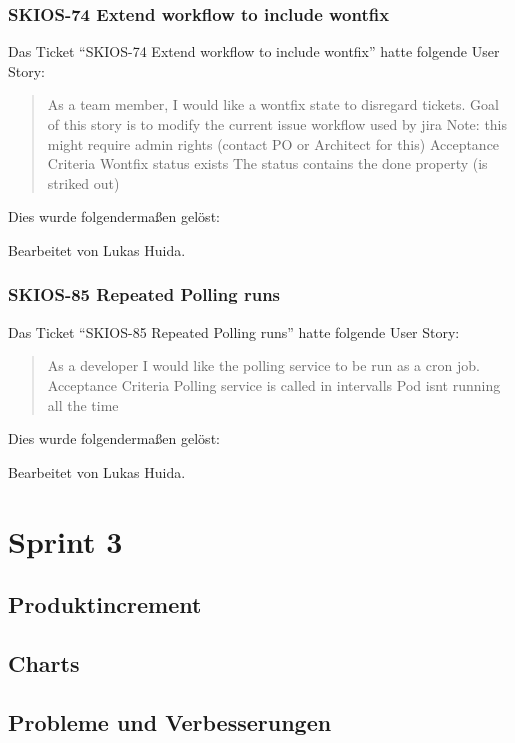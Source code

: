 \subsubsection{SKIOS-74 Extend workflow to include wontfix}
Das Ticket \enquote{SKIOS-74 Extend workflow to include wontfix} hatte folgende User Story:
\begin{quotation}
    As a team member, I would like a wontfix state  to disregard tickets.
    Goal of this story is to modify the current issue workflow used by jira
    Note: this might require admin rights (contact PO or Architect for this)
    Acceptance Criteria
    Wontfix status exists
    The status contains the done property (is striked out)
\end{quotation}
Dies wurde folgendermaßen gelöst:
\begin{quotation}
    
\end{quotation}
Bearbeitet von Lukas Huida.

\subsubsection{SKIOS-85 Repeated Polling runs}
Das Ticket \enquote{SKIOS-85 Repeated Polling runs} hatte folgende User Story:
\begin{quotation}
    As a developer I would like the polling service to be run as a cron job.
    Acceptance Criteria
    Polling service is called in intervalls
    Pod isnt running all the time
\end{quotation}
Dies wurde folgendermaßen gelöst:
\begin{quotation}
    
\end{quotation}
Bearbeitet von Lukas Huida.

\section{Sprint 3}

\subsection{Produktincrement}
\subsection{Charts}
\subsection{Probleme und Verbesserungen}


